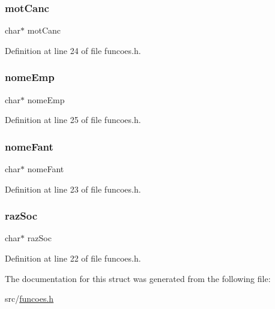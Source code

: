 \subsubsection{\texorpdfstring{mot\+Canc}{motCanc}}
{\footnotesize\ttfamily char$\ast$ mot\+Canc}



Definition at line 24 of file funcoes.\+h.

\mbox{\label{struct_registro_a219e87312ae777d8cea8fe37cd665e08}} 
\subsubsection{\texorpdfstring{nome\+Emp}{nomeEmp}}
{\footnotesize\ttfamily char$\ast$ nome\+Emp}



Definition at line 25 of file funcoes.\+h.

\mbox{\label{struct_registro_aa8e0b8aecdbb53a7c3611be836f6e326}} 
\subsubsection{\texorpdfstring{nome\+Fant}{nomeFant}}
{\footnotesize\ttfamily char$\ast$ nome\+Fant}



Definition at line 23 of file funcoes.\+h.

\mbox{\label{struct_registro_a57902a9f5b5fe15477db3d3f2040b476}} 
\subsubsection{\texorpdfstring{raz\+Soc}{razSoc}}
{\footnotesize\ttfamily char$\ast$ raz\+Soc}



Definition at line 22 of file funcoes.\+h.



The documentation for this struct was generated from the following file\+:\begin{DoxyCompactItemize}
\item 
src/\hyperlink{funcoes_8h}{funcoes.\+h}\end{DoxyCompactItemize}
